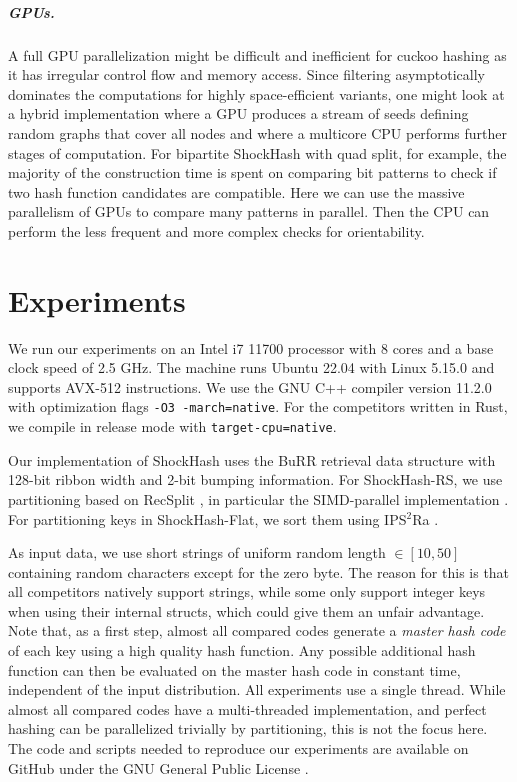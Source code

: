 \documentclass[a4paper,USenglish,cleveref]{lipics-v2021}
\newcommand{\myparagraph}[1]{\subparagraph*{#1}}
\begin{document}
\myparagraph{GPUs.}
A full GPU parallelization might be difficult and inefficient for cuckoo hashing as it has irregular control flow and memory access.
Since filtering asymptotically dominates the computations for highly space-efficient variants, one might look at a hybrid implementation where a GPU produces a stream of seeds defining random graphs that cover all nodes and where a multicore CPU performs further stages of computation.
%
For bipartite ShockHash with quad split, for example, the majority of the construction time is spent on comparing bit patterns to check if two hash function candidates are compatible.
Here we can use the massive parallelism of GPUs to compare many patterns in parallel.
Then the CPU can perform the less frequent and more complex checks for orientability.

\section{Experiments}\label{s:experiments}
We run our experiments on an Intel i7 11700 processor with 8 cores and a base clock speed of 2.5 GHz.
The machine runs Ubuntu 22.04 with Linux 5.15.0 and supports AVX-512 instructions.
We use the GNU C++ compiler version 11.2.0 with optimization flags \texttt{-O3 -march=native}.
For the competitors written in Rust, we compile in release mode with \texttt{target-cpu=native}.

Our implementation of ShockHash uses the BuRR retrieval data structure \cite{dillinger2022burr} with 128-bit ribbon width and 2-bit bumping information.
For ShockHash-RS, we use partitioning based on RecSplit \cite{esposito2020recsplit}, in particular the SIMD-parallel implementation \cite{bez2023high}.
For partitioning keys in ShockHash-Flat, we sort them using IPS$^2$Ra \cite{axtmann2020engineering}.

As input data, we use short strings of uniform random length $\in [10, 50]$ containing random characters except for the zero byte.
%
%
The reason for this is that all competitors natively support strings, while some only support integer keys when using their internal structs, which could give them an unfair advantage.
Note that, as a first step, almost all compared codes generate a \emph{master hash code} of each key using a high quality hash function.
Any possible additional hash function can then be evaluated on the master hash code in constant time, independent of the input distribution.
All experiments use a single thread.
While almost all compared codes have a multi-threaded implementation, and perfect hashing can be parallelized trivially by partitioning, this is not the focus here.
The code and scripts needed to reproduce our experiments are available on GitHub under the GNU General Public License \cite{sourceCode,sourceCodeCompetitors}.
%
\end{document}
